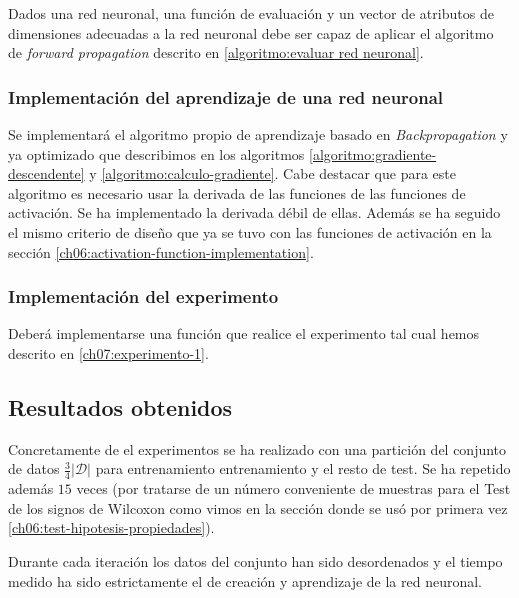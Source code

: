 Dados una red neuronal, una función de evaluación y un vector de atributos de dimensiones adecuadas a la red neuronal debe ser capaz de aplicar el algoritmo de \textit{forward propagation} descrito en \ref{algoritmo:evaluar red neuronal}.

\subsubsection{Implementación del aprendizaje de una red neuronal} 
Se implementará el algoritmo propio de aprendizaje basado en \textit{Backpropagation} y ya optimizado 
que describimos en los algoritmos \ref{algoritmo:gradiente-descendente} y \ref{algoritmo:calculo-gradiente}.
Cabe destacar que para este algoritmo es necesario usar la derivada de las funciones de las funciones de activación. Se ha implementado la derivada débil de ellas. Además se ha seguido el mismo criterio de diseño que ya se tuvo con las funciones de activación en la sección \ref{ch06:activation-function-implementation}.

\subsubsection{Implementación del experimento} 
Deberá implementarse una función que realice el 
experimento tal cual hemos descrito en \ref{ch07:experimento-1}.

\subsection{Resultados obtenidos}

Concretamente de el experimentos se ha realizado con 
una partición del conjunto de datos $\frac{3}{4}|\mathcal{D}|$ para entrenamiento entrenamiento 
y el resto de test. Se ha repetido además $15$ veces (por tratarse de un número conveniente de muestras para el Test de los signos de Wilcoxon como vimos en la sección donde se usó por primera vez \ref{ch06:test-hipotesis-propiedades}). 

Durante cada iteración los datos del conjunto han sido desordenados y el tiempo medido ha sido estrictamente el de creación y aprendizaje de la red neuronal. 

